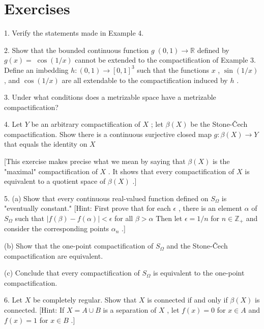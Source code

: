 \documentclass[10pt]{article}
\begin{document}
\section*{Exercises}

1. Verify the statements made in Example 4.

2. Show that the bounded continuous function \(g\;\left( {0,1}\right)  \rightarrow  \mathbb{R}\) defined by \(g\left( x\right)  = \; \cos \left( {1/x}\right)\) cannot be extended to the compactification of Example 3. Define an imbedding \(h : \left( {0,1}\right)  \rightarrow  {\left\lbrack  0,1\right\rbrack  }^{3}\) such that the functions \(x\) , \(\sin \left( {1/x}\right)\) , and \(\cos \left( {1/x}\right)\) are all extendable to the compactification induced by \(h\) .

3. Under what conditions does a metrizable space have a metrizable compactification?

4. Let \(Y\) be an arbitrary compactification of \(X\) ; let \(\beta \left( X\right)\) be the Stone-Čech compactification. Show there is a continuous surjective closed map \(g : \beta \left( X\right)  \rightarrow  Y\) that equals the identity on \(X\)

[This exercise makes precise what we mean by saying that \(\beta \left( X\right)\) is the "maximal" compactification of \(X\) . It shows that every compactification of \(X\) is equivalent to a quotient space of \(\beta \left( X\right)\) .]

5. (a) Show that every continuous real-valued function defined on \({S}_{\Omega }\) is "eventually constant." [Hint: First prove that for each \(\epsilon\) , there is an element \(\alpha\) of \({S}_{\Omega }\) such that \(\left| {f\left( \beta \right)  - f\left( \alpha \right) }\right|  < \epsilon\) for all \(\beta  > \alpha\) Then let \(\epsilon  = 1/n\) for \(n \in  {\mathbb{Z}}_{ + }\) and consider the corresponding points \({\alpha }_{n}\) .]

(b) Show that the one-point compactification of \({S}_{\Omega }\) and the Stone-Čech compactification are equivalent.

(c) Conclude that every compactification of \({S}_{\Omega }\) is equivalent to the one-point compactification.

6. Let \(X\) be completely regular. Show that \(X\) is connected if and only if \(\beta \left( X\right)\) is connected. [Hint: If \(X = A \cup  B\) is a separation of \(X\) , let \(f\left( x\right)  = 0\) for \(x \in  A\) and \(f\left( x\right)  = 1\) for \(x \in  B\) .]
\end{document}
